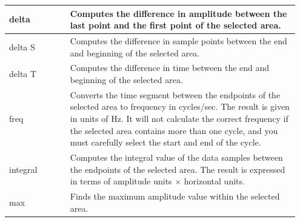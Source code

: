 \documentclass{article}
\begin{document}
\begin{table}[h!]
\begin{tabular}[h!]{p{0.2\linewidth}p{0.75\linewidth}}
\midrule
delta & Computes the difference in amplitude between the last point and the first point of the selected area.\\
\midrule
delta S & Computes the difference in sample points between the end and beginning of the selected area.\\
\midrule
delta T & Computes the difference in time between the end and beginning of the selected area.\\
\midrule
freq & Converts the time segment between the endpoints of the selected area to frequency in cycles/sec. The result is given in units of Hz. It will not calculate the correct frequency if the selected area contains more than one cycle, and you must carefully select the start and end of the cycle.\\
\midrule
integral & Computes the integral value of the data samples between the endpoints of the selected area. The result is expressed in terms of amplitude units $\times$ horizontal units.\\
\midrule
max & Finds the maximum amplitude value within the selected area.\\
\bottomrule
\end{tabular}
\end{table}
\end{document}

